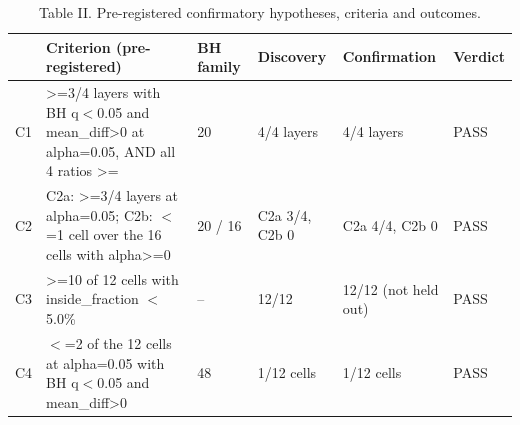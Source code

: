 \begin{table}[t]
\centering
\caption{Table II. Pre-registered confirmatory hypotheses, criteria and outcomes.}
\label{tab:ii}
\begin{tabular}{llllll}
\toprule
 & Criterion (pre-registered) & BH family & Discovery & Confirmation & Verdict \\
\midrule
C1 & >=3/4 layers with BH q$<$0.05 and mean\_diff>0 at alpha=0.05, AND all 4 ratios >= & 20 & 4/4 layers & 4/4 layers & PASS \\
C2 & C2a: >=3/4 layers at alpha=0.05; C2b: $<$=1 cell over the 16 cells with alpha>=0 & 20 / 16 & C2a 3/4, C2b 0 & C2a 4/4, C2b 0 & PASS \\
C3 & >=10 of 12 cells with inside\_fraction $<$ 5.0\% & -- & 12/12 & 12/12 (not held out) & PASS \\
C4 & $<$=2 of the 12 cells at alpha=0.05 with BH q$<$0.05 and mean\_diff>0 & 48 & 1/12 cells & 1/12 cells & PASS \\
\bottomrule
\end{tabular}
\end{table}
